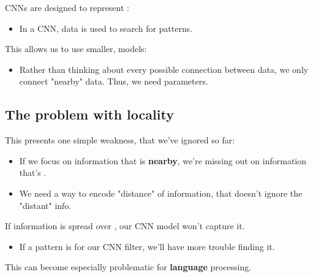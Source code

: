     \begin{concept}
        CNNs are designed to represent :

        \begin{itemize}
            \item In a CNN,  data is used to search for patterns.
        \end{itemize}

        This allows us to use smaller,  models:

        \begin{itemize}
            \item Rather than thinking about every possible connection between data, we only connect "nearby" data. Thus, we need  parameters.
        \end{itemize}
    \end{concept}




\phantom{}

\subsection{The problem with locality}

    This presents one simple weakness, that we've ignored so far:

    \begin{itemize}
        \item If we focus on information that is \textbf{nearby}, we're missing out on information that's .

        \item We need a way to encode "distance" of information, that doesn't ignore the "distant" info.\\
    \end{itemize}

    \begin{concept}
        If information is spread over , our CNN model won't capture it.

        \begin{itemize}
            \item If a pattern is  for our CNN filter, we'll have more trouble finding it.
        \end{itemize}
    \end{concept}

    This can become especially problematic for \textbf{language} processing.

